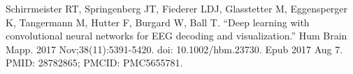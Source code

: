 \documentclass[10pt]{article}
\newlength{\cslhangindent}
\newlength{\cslentryspacingunit} %
\newenvironment{CSLReferences}[2] %
{%
    \setlength{\parindent}{0pt}
    \ifodd #1
        \let\oldpar\par
        \def\par{\hangindent=\cslhangindent\oldpar}
    \fi
    \setlength{\parskip}{#2\cslentryspacingunit}
}%
{}
\begin{document}
\vspace{0.5cm}
\begin{CSLReferences}{1}{0}
\leavevmode{}%
Schirrmeister RT, Springenberg JT, Fiederer LDJ, Glasstetter M, Eggensperger K, Tangermann M, Hutter F, Burgard W, Ball T. {``Deep learning with convolutional neural networks for EEG decoding and visualization.''} Hum Brain Mapp. 2017 Nov;38(11):5391-5420. doi: 10.1002/hbm.23730. Epub 2017 Aug 7. PMID: 28782865; PMCID: PMC5655781.
\url{}
\end{CSLReferences}
\end{document}
